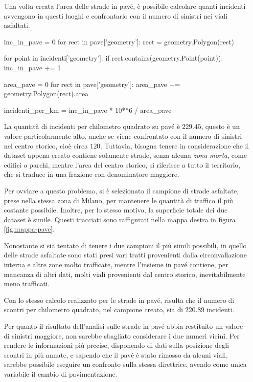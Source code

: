 \documentclass[a4paper,12pt]{report}
\newcommand{\quotestyle}[1]{\textit{#1}}
\begin{document}
Una volta creata l'area delle strade in pavé, è possibile calcolare quanti 
incidenti avvengono in questi luoghi e confrontarlo con il numero di sinistri 
nei viali asfaltati. 

\begin{code}
inc_in_pave = 0
for rect in pave['geometry']: 
    rect = geometry.Polygon(rect)

    for point in incidenti['geometry']: 
        if rect.contains(geometry.Point(point)): 
            inc_in_pave += 1

area_pave = 0
for rect in pave['geometry']: 
    area_pave += geometry.Polygon(rect).area

incidenti_per_km = inc_in_pave * 10**6 / area_pave
\end{code}

La quantità di incidenti per chilometro quadrato su pavé è $229.45$, 
questo è un valore particolarmente alto, anche se viene confrontato con il numero di 
sinistri nel centro storico, cioè circa $120$. 
Tuttavia, bisogna tenere in considerazione che il dataset appena creato 
contiene solamente strade, senza alcuna \quotestyle{zona morta}, 
come edifici o parchi, mentre l'area del centro storico, 
si riferisce a tutto il territorio, che si traduce in una frazione con 
denominatore maggiore. 

Per ovviare a questo problema, si è selezionato il campione di strade asfaltate, 
prese nella stessa zona di Milano, per mantenere le quantità di traffico il più 
costante possibile. 
Inoltre, per lo stesso motivo, la superficie totale dei due dataset è simile. 
Questi tracciati sono raffigurati nella mappa destra in figura \ref{fig:mappa-pave}. 

Nonostante si sia tentato di tenere i due campioni il più simili 
possibili, in quello delle strade asfaltate sono stati presi vari tratti 
provenienti dalla circonvallazione interna e altre zone molto trafficate, 
mentre l'insieme in pavé contiene, per mancanza di altri dati, 
molti viali provenienti dal centro storico, inevitabilmente 
meno trafficati. 

Con lo stesso calcolo realizzato per le strade in pavé, risulta che 
il numero di scontri per 
chilometro quadrato, nel campione creato, sia di $220.89$ incidenti. 

Per quanto il risultato dell'analisi sulle strade in pavé abbia restituito un valore di 
sinistri maggiore, non sarebbe sbagliato considerare i due numeri vicini. 
Per rendere le informazioni più precise, disponendo di dati sulla 
posizione degli scontri in più annate, e sapendo che il pavé è stato 
rimosso da alcuni viali, sarebbe possibile eseguire un confronto 
sulla stessa direttrice, avendo come unica variabile il cambio di pavimentazione. 
\end{document}
